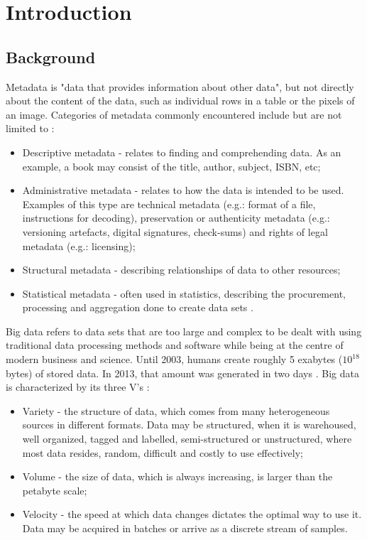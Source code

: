 \chapter{Introduction}
\label{cha:intro}

 \section{Background}

 Metadata is "data that provides information about other data", but not directly about the content of the data, such as individual rows in a table or the pixels of an image. Categories of metadata commonly encountered include but are not limited to \cite{understandingMetadataRiley2017}:

\begin{itemize}
    \item Descriptive metadata - relates to finding and comprehending data. As an example, a book may consist of the title, author, subject, ISBN, etc;
    \item Administrative metadata - relates to how the data is intended to be used. Examples of this type are technical metadata (e.g.: format of a file, instructions for decoding), preservation or authenticity metadata (e.g.: versioning artefacts, digital signatures, check-sums) and rights of legal metadata (e.g.: licensing);
    \item Structural metadata - describing relationships of data to other resources;
    \item Statistical metadata - often used in statistics, describing the procurement, processing and aggregation done to create data sets \cite{roleOfMetadataInStatisticsdippo2000}. 
\end{itemize}

Big data refers to data sets that are too large and complex to be dealt with using traditional data processing methods and software while being at the centre of modern business and science. Until 2003, humans create roughly 5 exabytes ($10^{18}$ bytes) of stored data. In 2013, that amount was generated in two days \cite{bigDataAReviewsagiroglu2013}. Big data is characterized by its three V's \cite{understandingBigDataZikopoulos2011}:

\begin{itemize}
    \item Variety - the structure of data, which comes from many heterogeneous sources in different formats. Data may be structured, when it is warehoused, well organized, tagged and labelled, semi-structured or unstructured, where most data resides, random, difficult and costly to use effectively;
    \item Volume - the size of data, which is always increasing, is larger than the petabyte scale;
    \item Velocity - the speed at which data changes dictates the optimal way to use it. Data may be acquired in batches or arrive as a discrete stream of samples.
\end{itemize}

